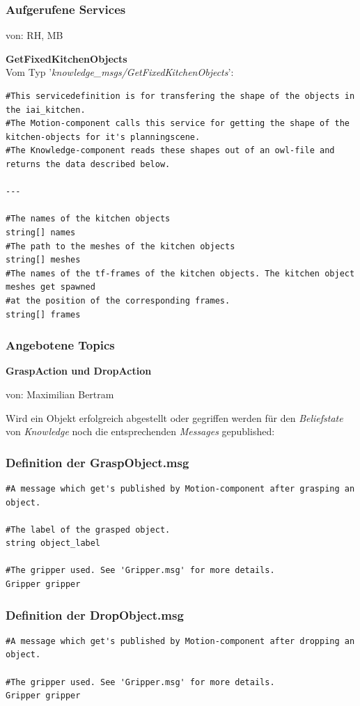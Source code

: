 \documentclass{suturo}
\makeatletter
\newcommand{\chapterauthor}[1]{%
  {\parindent0pt\vspace*{-27pt}%
  \linespread{0}\small\begin{flushright}von: #1\end{flushright}%
  \par\nobreak\vspace*{0pt}}
  \@afterheading%
}
\makeatother
\begin{document}
\subsubsection{Aufgerufene Services}
\chapterauthor{RH, MB}
\textbf{GetFixedKitchenObjects}\\
Vom Typ '\textit{knowledge\_msgs/GetFixedKitchenObjects}': \\ 
\begin{verbatim}
#This servicedefinition is for transfering the shape of the objects in the iai_kitchen.
#The Motion-component calls this service for getting the shape of the kitchen-objects for it's planningscene.
#The Knowledge-component reads these shapes out of an owl-file and returns the data described below.

---

#The names of the kitchen objects
string[] names
#The path to the meshes of the kitchen objects
string[] meshes
#The names of the tf-frames of the kitchen objects. The kitchen object meshes get spawned
#at the position of the corresponding frames.
string[] frames
\end{verbatim}

\subsubsection{Angebotene Topics}
\textbf{GraspAction und DropAction}
\chapterauthor{Maximilian Bertram}

Wird ein Objekt erfolgreich abgestellt oder gegriffen werden für den \textit{Beliefstate} von \textit{Knowledge} noch die entsprechenden \textit{Messages} gepublished: \\

\subsubsection*{Definition der GraspObject.msg}
\begin{verbatim}
#A message which get's published by Motion-component after grasping an object.

#The label of the grasped object.
string object_label

#The gripper used. See 'Gripper.msg' for more details.
Gripper gripper
\end{verbatim}

\subsubsection*{Definition der DropObject.msg}
\begin{verbatim}
#A message which get's published by Motion-component after dropping an object.

#The gripper used. See 'Gripper.msg' for more details.
Gripper gripper
\end{verbatim}
\end{document}
